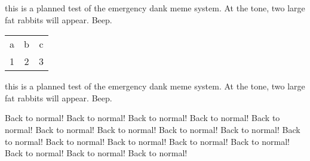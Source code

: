 \documentclass[12pt]{report}
\begin{document}

\begin{minipage}[c]{0.3\textwidth} %
this is a planned test of the emergency dank meme system. At the tone, two large fat rabbits will appear. Beep. 
\end{minipage}
\begin{minipage}[c]{0.3\textwidth}
\centering 
\begin{tabular}{|c | c | c|}
\hline 
a & b & c \\
1 & 2 & 3 \\
\hline 
\end{tabular}
\end{minipage}
\begin{minipage}[c]{0.3\textwidth} %
this is a planned test of the emergency dank meme system. At the tone, two large fat rabbits will appear. Beep. 
\end{minipage}

\vspace{2em}
Back to normal! Back to normal! Back to normal! Back to normal! Back to normal! Back to normal! Back to normal! Back to normal! Back to normal! Back to normal! Back to normal! Back to normal! Back to normal! Back to normal! Back to normal! Back to normal! Back to normal! 
\end{document}
